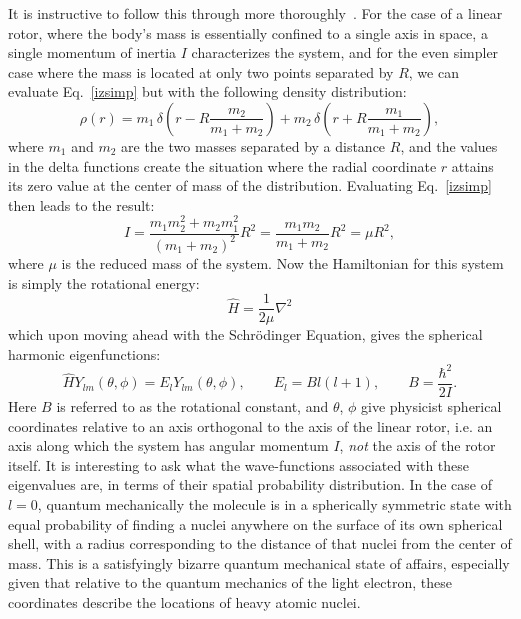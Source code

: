 It is instructive to follow this through more thoroughly~\citep[Sec.~2.8]{Brown2003}.
For the case of a linear rotor, where the body's mass is essentially confined to a single axis in space, a single momentum of inertia $I$ characterizes the system, and for the even simpler case where the mass is located at only two points separated by $R$, we can evaluate Eq.~\ref{izsimp} but with the following density distribution:
\begin{equation}
\rho(r)=m_1\,\delta\!\left(r-R\frac{m_2}{m_1+m_2}\right)+m_2\,\delta\!\left(r+R\frac{m_1}{m_1+m_2}\right),
\end{equation}
where $m_1$ and $m_2$ are the two masses separated by a distance $R$, and the values in the delta functions create the situation where the radial coordinate $r$ attains its zero value at the center of mass of the distribution.
Evaluating Eq.~\ref{izsimp} then leads to the result:
\begin{equation}
I = \frac{m_1m_2^2+m_2m_1^2}{(m_1+m_2)^2}R^2 = \frac{m_1m_2}{m_1+m_2}R^2 = \mu R^2,\label{eqdefI}
\end{equation}
where $\mu$ is the reduced mass of the system.
Now the Hamiltonian for this system is simply the rotational energy:
\begin{equation}
\hat{H} = \frac{1}{2\mu}\nabla^2
\end{equation}
which upon moving ahead with the Schr\"{o}dinger Equation, gives the spherical harmonic eigenfunctions:
\begin{equation}
\hat{H}Y_{lm}(\theta,\phi) = E_lY_{lm}(\theta,\phi),\qquad E_l = Bl(l+1),\qquad B=\frac{\hbar^2}{2I}.\label{eqdefb}
\end{equation}
Here $B$ is referred to as the rotational constant, and $\theta$, $\phi$ give physicist spherical coordinates relative to an axis orthogonal to the axis of the linear rotor, i.e. an axis along which the system has angular momentum $I$, \emph{not} the axis of the rotor itself.
It is interesting to ask what the wave-functions associated with these eigenvalues are, in terms of their spatial probability distribution. 
In the case of $l=0$, quantum mechanically the molecule is in a spherically symmetric state with equal probability of finding a nuclei anywhere on the surface of its own spherical shell, with a radius corresponding to the distance of that nuclei from the center of mass.
This is a satisfyingly bizarre quantum mechanical state of affairs, especially given that relative to the quantum mechanics of the light electron, these coordinates describe the locations of heavy atomic nuclei.

